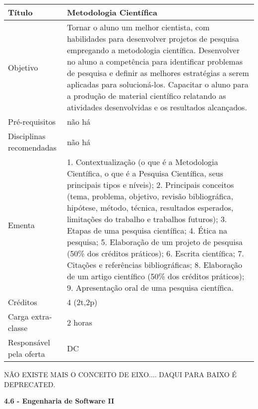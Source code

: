 \begin{center}
\begin{tabular}{|p{4.5cm}|p{10.0cm}|} \hline
Título & Metodologia Científica \\ \hline
Objetivo & Tornar o aluno um melhor cientista, com habilidades para desenvolver projetos de pesquisa empregando a metodologia científica. Desenvolver no aluno a competência para identificar problemas de pesquisa e definir as melhores estratégias a serem aplicadas para solucioná-los. Capacitar o aluno para a produção de material científico relatando as atividades desenvolvidas e os resultados alcançados. \\ \hline
Pré-requisitos & não há \\ \hline
Disciplinas recomendadas & não há \\ \hline

Ementa & 1. Contextualização (o que é a Metodologia Científica, o que é a Pesquisa Científica, seus principais tipos e níveis); 2. Principais conceitos (tema, problema, objetivo, revisão bibliográfica, hipótese, método, técnica, resultados esperados, limitações do trabalho e trabalhos futuros); 3. Etapas de uma pesquisa científica; 4. Ética na pesquisa; 5. Elaboração de um projeto de pesquisa (50\% dos créditos práticos); 6. Escrita científica; 7. Citações e referências bibliográficas; 8. Elaboração de um artigo científico (50\% dos créditos práticos); 9. Apresentação oral de uma pesquisa científica.\\ \hline


Créditos & 4 (2t,2p) \\ \hline
Carga extra-classe & 2 horas \\ \hline
Responsável pela oferta & DC \\ \hline
\end{tabular}
\end{center}







NÃO EXISTE MAIS O CONCEITO DE EIXO.... DAQUI PARA BAIXO É DEPRECATED.




\textbf{4.6 - Engenharia de Software II}


